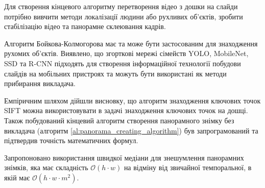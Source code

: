 \chapterConclusion

Для створення кінцевого алгоритму перетворення відео з дошки на слайди 
потрібно вивчити методи локалізації людини або рухливих об'єктів,
зробити стабілізацію відео та панорамне склеювання кадрів.


Алгоритм Бойкова-Колмогорова має та може бути застосованим для знаходження
рухомих об'єктів.
Виявлено, що згорткові мережі сімейств YOLO, MobileNet, SSD та R-CNN 
підходять для створення інформаційної технології побудови слайдів на
мобільних пристроях та можуть бути використані як методи прибирання викладача.


Емпіричним шляхом дійшли висновку, що алгоритм знаходження ключових точок SIFT можна використовувати 
в задачі знаходження ключових точок на дошці. Також побудований кінцевий алгоритм створення
панорамного знімку без викладача (алгоритм \ref{al:panorama_creating_algorithm}) був запрограмований та 
підтвердив точність математичних формул.


Запропоновано використання швидкої медіани для знешумлення панорамних знімків, 
яка має складність $\mathcal{O}(h \cdot w)$ на відміну від звичайної темпоральної, в
якій має $\mathcal{O}(h \cdot w \cdot m^2)$.
